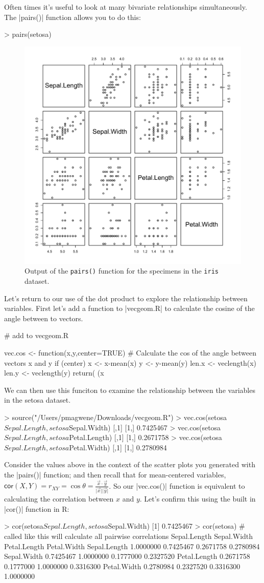 Often times it's useful to look at many bivariate relationships simultaneously. The |pairs()| function allows you to do this:
%
\begin{R}
> pairs(setosa)
\end{R}
%
\begin{figure}[htbp]
\centering
\includegraphics[width=0.5\columnwidth]{./figures/hands-on2/pairs-output.pdf}
\caption{Output of the \lstinline!pairs()! function for the  specimens in the \lstinline|iris| dataset.}
\end{figure}

Let's return to our use of the dot product to explore the relationship between variables. First let's add a function to |vecgeom.R| to calculate the cosine of the angle between to vectors.
\begin{R}
# add to vecgeom.R

vec.cos <- function(x,y,center=TRUE) {
  # Calculate the cos of the angle between vectors x and y
  if (center){
    x <- x-mean(x)
    y <- y-mean(y)
  }
  len.x <- veclength(x)
  len.y <- veclength(y)
  return( (x %
}
\end{R}
We can then use this funciton to examine the relationship between the variables in the setosa dataset.
\begin{R}
> source("/Users/pmagwene/Downloads/vecgeom.R")
> vec.cos(setosa$Sepal.Length, setosa$Sepal.Width)
          [,1]
[1,] 0.7425467
> vec.cos(setosa$Sepal.Length, setosa$Petal.Length)
          [,1]
[1,] 0.2671758
> vec.cos(setosa$Sepal.Length, setosa$Petal.Width)
          [,1]
[1,] 0.2780984
\end{R}
Consider the values above in the context of the scatter plots you generated with the |pairs()| function; and then recall that for mean-centered variables, $\mathsf{cor}(X,Y) = r_{XY} = \cos \theta = \frac{\vec{x} \cdot \vec{y}}{\vert \vec{x}\vert \vert \vec{y} \vert}$.  So our |vec.cos()| function is equivalent to calculating the correlation between $x$ and $y$.  Let's confirm this using the built in |cor()| function in R:
\begin{R}
> cor(setosa$Sepal.Length, setosa$Sepal.Width)
[1] 0.7425467
> cor(setosa)  # called like this will calculate all pairwise correlations
             Sepal.Length Sepal.Width Petal.Length Petal.Width
Sepal.Length    1.0000000   0.7425467    0.2671758   0.2780984
Sepal.Width     0.7425467   1.0000000    0.1777000   0.2327520
Petal.Length    0.2671758   0.1777000    1.0000000   0.3316300
Petal.Width     0.2780984   0.2327520    0.3316300   1.0000000
\end{R}